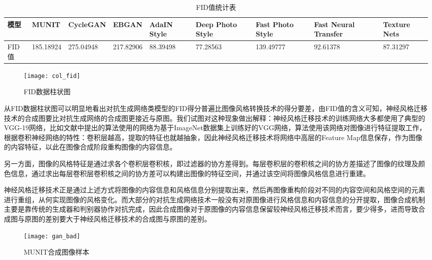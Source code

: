 \begin{table}[h] 
    \centering
    \scriptsize
    \caption{FID值统计表}
    \begin{tabular}{l*{4}{p{2.5cm}}}
        \toprule
        模型 & MUNIT & CycleGAN & EBGAN & AdaIN Style & Deep Photo Style & Fast Photo Style & Fast Neural Transfer & Texture Nets \\
        \midrule
        FID值 & 185.18924 & 275.04948 & 217.82906 & 88.39498 & 77.28563 & 139.49777 & 92.61378 & 87.31297  \\
        \bottomrule
    \end{tabular}
    \label{table:fid}
\end{table}

\begin{figure}[h]
    \centering
    \texttt{[image: col\_fid]}
    \caption{FID数据柱状图}
    \label{col_fid}
\end{figure}

从FID数据柱状图可以明显地看出对抗生成网络类模型的FID得分普遍比图像风格转换技术的得分要差，由FID值的含义可知，神经风格迁移技术的合成图要比对抗生成网络的合成图更接近与原图。我们试图对这种现象做出解释：神经风格迁移技术的训练网络大多都使用了典型的VGG-19网络，比如文献\cite{nst}中提出的算法使用的网络为基于ImageNet数据集\cite{ImageNet}上训练好的VGG网络，算法使用该网络对图像进行特征提取工作，根据卷积神经网络的特性：卷积层越高，提取的特征也就越抽象，因此神经风格迁移技术将网络中高层的Feature Map信息保存，作为图像的内容特征，以此在图像合成阶段重构图像的内容信息。 

另一方面，图像的风格特征是通过求各个卷积层卷积核，即过滤器的协方差得到。每层卷积层的卷积核之间的协方差描述了图像的纹理及颜色信息，通过求出每层卷积层卷积核之间的协方差可以构建出图像的特征空间，并通过该空间将图像风格信息进行重建。

神经风格迁移技术正是通过上述方式将图像的内容信息和风格信息分别提取出来，然后再图像重构阶段对不同的内容空间和风格空间的元素进行重组，从何实现图像的风格变化。而大部分的对抗生成网络技术一般没有对原图像进行风格信息和内容信息的分开提取，图像合成机制主要是靠传统的生成器和判别器协作对抗完成，因此合成图像对于原图像的内容信息保留较神经风格迁移技术而言，要少得多，进而导致合成图与原图的差别要大于神经风格迁移技术的合成图与原图的差别。

\begin{figure}[h]
    \centering
    \texttt{[image: gan\_bad]}
    \caption{MUNIT合成图像样本}
    \label{fig:gan}
\end{figure}

